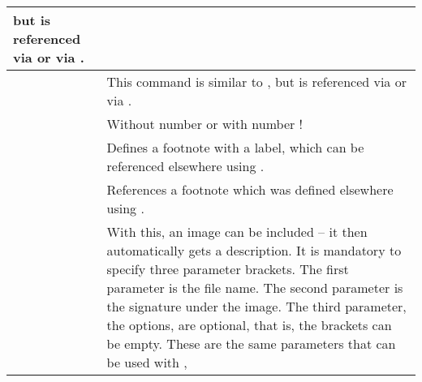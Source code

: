 \begin{footnotesize}
\begin{longtable}{ | P{0.55\textwidth} | p{0.4\textwidth} | }
        but is referenced via
         or via
        .                                              \\
        \hline
                           &
        This command is similar to
        , but is
        referenced via
         or via
        .                                                \\
        \hline
                                       &
        Without number \tsDegree{} or with number !                                            \\
        \hline
                           &
        Defines a footnote with
        a label, which can be referenced elsewhere using
        .                                                \\
        \hline
                                   &
        References a footnote which was defined elsewhere
        using .                                  \\
        \hline
          &
        With this, an image can be included -- it then automatically gets a
        description. It is mandatory to specify three parameter brackets.
        The first parameter is the file name. The second parameter is the
        signature under the image. The third parameter, the options, are
        optional, that is, the brackets can be empty. These are the same
        parameters that can be used with
        ,

\end{longtable}
\end{footnotesize}
